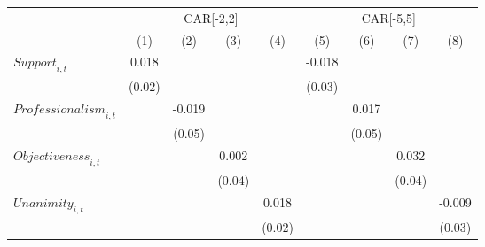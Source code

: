 {
\def\sym#1{\ifmmode^{#1}\else\(^{#1}\)\fi}
\begin{tabular}{l*{8}{c}}
\toprule
                    &\multicolumn{4}{c}{CAR[-2,2]}                                                          &\multicolumn{4}{c}{CAR[-5,5]}                                                          \\\cmidrule(lr){2-5}\cmidrule(lr){6-9}
                    &\multicolumn{1}{c}{(1)}         &\multicolumn{1}{c}{(2)}         &\multicolumn{1}{c}{(3)}         &\multicolumn{1}{c}{(4)}         &\multicolumn{1}{c}{(5)}         &\multicolumn{1}{c}{(6)}         &\multicolumn{1}{c}{(7)}         &\multicolumn{1}{c}{(8)}         \\
\midrule
$\textit{Support}_{i,t}$&       0.018         &                     &                     &                     &      -0.018         &                     &                     &                     \\
                    &      (0.02)         &                     &                     &                     &      (0.03)         &                     &                     &                     \\
$\textit{Professionalism}_{i,t}$&                     &      -0.019         &                     &                     &                     &       0.017         &                     &                     \\
                    &                     &      (0.05)         &                     &                     &                     &      (0.05)         &                     &                     \\
$\textit{Objectiveness}_{i,t}$&                     &                     &       0.002         &                     &                     &                     &       0.032         &                     \\
                    &                     &                     &      (0.04)         &                     &                     &                     &      (0.04)         &                     \\
$\textit{Unanimity}_{i,t}$&                     &                     &                     &       0.018         &                     &                     &                     &      -0.009         \\
                    &                     &                     &                     &      (0.02)         &                     &                     &                     &      (0.03)         \\

\end{tabular}}

